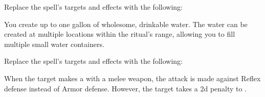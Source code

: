 


Replace the spell's targets and effects with the following:
\begin{spellcontent}

\begin{augmenttargetinginfo}




\end{augmenttargetinginfo}


\begin{augmenteffects}



\spelleffect
You create up to one gallon of wholesome, drinkable water.
The water can be created at multiple locations within the ritual's range, allowing you to fill multiple small water containers.








\end{augmenteffects}

\end{spellcontent}








Replace the spell's targets and effects with the following:
\begin{spellcontent}

\begin{augmenttargetinginfo}



\end{augmenttargetinginfo}


\begin{augmenteffects}



\spelleffect
When the target makes a  with a melee weapon, the attack is made against Reflex defense instead of Armor defense.
However, the target takes a \minus2d penalty to .








\end{augmenteffects}

\end{spellcontent}





